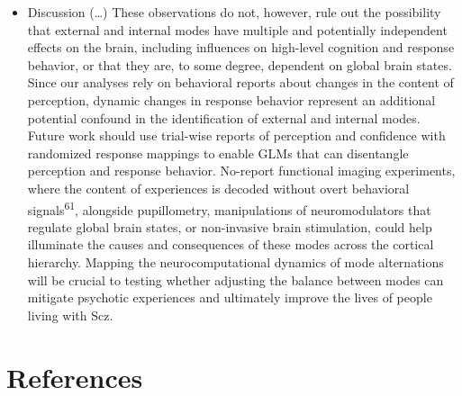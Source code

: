 \documentclass[
]{article}
\providecommand{\tightlist}{%
  \setlength{\itemsep}{0pt}\setlength{\parskip}{0pt}}
\begin{document}
\begin{itemize}
\tightlist
\item
  Discussion (\ldots) These observations do not, however, rule out the
  possibility that external and internal modes have multiple and
  potentially independent effects on the brain, including influences on
  high-level cognition and response behavior, or that they are, to some
  degree, dependent on global brain states. Since our analyses rely on
  behavioral reports about changes in the content of perception, dynamic
  changes in response behavior represent an additional potential
  confound in the identification of external and internal modes. Future
  work should use trial-wise reports of perception and confidence with
  randomized response mappings to enable GLMs that can disentangle
  perception and response behavior. No-report functional imaging
  experiments, where the content of experiences is decoded without overt
  behavioral signals\textsuperscript{61}, alongside pupillometry,
  manipulations of neuromodulators that regulate global brain states, or
  non-invasive brain stimulation, could help illuminate the causes and
  consequences of these modes across the cortical hierarchy. Mapping the
  neurocomputational dynamics of mode alternations will be crucial to
  testing whether adjusting the balance between modes can mitigate
  psychotic experiences and ultimately improve the lives of people
  living with Scz.
\end{itemize}

\newpage

\section*{References}\label{references}
\end{document}
